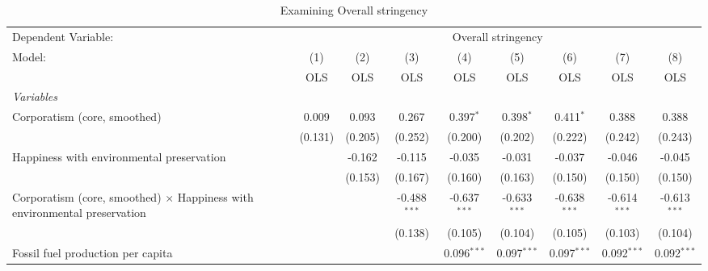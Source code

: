 
\begin{table}[htbp]
   \caption{Examining Overall stringency}
   \centering
   \begin{tabular}{lcccccccc}
      \toprule
      Dependent Variable: & \multicolumn{8}{c}{Overall stringency}\\
      Model:                                                                           & (1)     & (2)     & (3)            & (4)            & (5)            & (6)            & (7)            & (8)\\  
                                                                                       &  OLS    & OLS     & OLS            & OLS            & OLS            & OLS            & OLS            & OLS\\  
      \midrule
      \emph{Variables}\\
      Corporatism (core, smoothed)                                                     & 0.009   & 0.093   & 0.267          & 0.397$^{*}$    & 0.398$^{*}$    & 0.411$^{*}$    & 0.388          & 0.388\\   
                                                                                       & (0.131) & (0.205) & (0.252)        & (0.200)        & (0.202)        & (0.222)        & (0.242)        & (0.243)\\   
      Happiness with environmental preservation                                        &         & -0.162  & -0.115         & -0.035         & -0.031         & -0.037         & -0.046         & -0.045\\   
                                                                                       &         & (0.153) & (0.167)        & (0.160)        & (0.163)        & (0.150)        & (0.150)        & (0.150)\\   
      Corporatism (core, smoothed) $\times$ Happiness with environmental preservation  &         &         & -0.488$^{***}$ & -0.637$^{***}$ & -0.633$^{***}$ & -0.638$^{***}$ & -0.614$^{***}$ & -0.613$^{***}$\\   
                                                                                       &         &         & (0.138)        & (0.105)        & (0.104)        & (0.105)        & (0.103)        & (0.104)\\   
      Fossil fuel production per capita                                                &         &         &                & 0.096$^{***}$  & 0.097$^{***}$  & 0.097$^{***}$  & 0.092$^{***}$  & 0.092$^{***}$\\   

\end{tabular}
\end{table}
